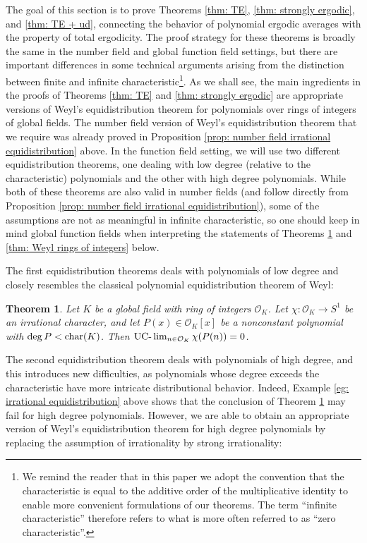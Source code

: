 \documentclass{amsart}
\newtheorem{theorem}{Theorem}[section]
\theoremstyle{definition}
\numberwithin{equation}{section}
\newcommand{\mO}{\mathcal{O}}
\newcommand{\UClim}{\textup{UC-}\lim}
\renewcommand{\char}{\textup{char}}
\begin{document}
The goal of this section is to prove Theorems \ref{thm: TE}, \ref{thm: strongly ergodic}, and \ref{thm: TE + ud}, connecting the behavior of polynomial ergodic averages with the property of total ergodicity.
The proof strategy for these theorems is broadly the same in the number field and global function field settings, but there are important differences in some technical arguments arising from the distinction between finite and infinite characteristic\footnote{We remind the reader that in this paper we adopt the convention that the characteristic is equal to the additive order of the multiplicative identity to enable more convenient formulations of our theorems. The term ``infinite characteristic'' therefore refers to what is more often referred to as ``zero characteristic''.}.
As we shall see, the main ingredients in the proofs of Theorems \ref{thm: TE} and \ref{thm: strongly ergodic} are appropriate versions of Weyl's equidistribution theorem for polynomials over rings of integers of global fields.
The number field version of Weyl's equidistribution theorem that we require was already proved in Proposition \ref{prop: number field irrational equidistribution} above.
In the function field setting, we will use two different equidistribution theorems, one dealing with low degree (relative to the characteristic) polynomials and the other with high degree polynomials.
While both of these theorems are also valid in number fields (and follow directly from Proposition \ref{prop: number field irrational equidistribution}), some of the assumptions are not as meaningful in infinite characteristic, so one should keep in mind global function fields when interpreting the statements of Theorems \ref{thm: Weyl rings of integers low degree} and \ref{thm: Weyl rings of integers} below.

The first equidistribution theorems deals with polynomials of low degree and closely resembles the classical polynomial equidistribution theorem of Weyl:

\begin{theorem} \label{thm: Weyl rings of integers low degree}
    Let $K$ be a global field with ring of integers $\mO_K$.
    Let $\chi : \mO_K \to S^1$ be an irrational character, and let $P(x) \in \mO_K[x]$ be a nonconstant polynomial with $\deg{P} < \char(K)$.
    Then $\UClim_{n \in \mO_K} \chi(P(n)) = 0$.
\end{theorem}

The second equidistribution theorem deals with polynomials of high degree, and this introduces new difficulties, as polynomials whose degree exceeds the characteristic have more intricate distributional behavior.
Indeed, Example \ref{eg: irrational equidistribution} above shows that the conclusion of Theorem \ref{thm: Weyl rings of integers low degree} may fail for high degree polynomials.
However, we are able to obtain an appropriate version of Weyl's equidistribution theorem for high degree polynomials by replacing the assumption of irrationality by strong irrationality:
\end{document}
